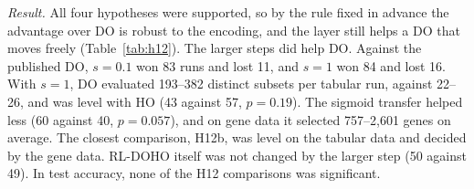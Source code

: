 \documentclass[journal]{IEEEtran}
\begin{document}
\emph{Result.} All four hypotheses were supported, so by the rule fixed in advance the advantage over DO is robust to the encoding, and the layer still helps a DO that moves freely (Table~\ref{tab:h12}). The larger steps did help DO. Against the published DO, $s=0.1$ won 83 runs and lost 11, and $s=1$ won 84 and lost 16. With $s=1$, DO evaluated 193--382 distinct subsets per tabular run, against 22--26, and was level with HO (43 against 57, $p=0.19$). The sigmoid transfer helped less (60 against 40, $p=0.057$), and on gene data it selected 757--2,601 genes on average. The closest comparison, H12b, was level on the tabular data and decided by the gene data. RL-DOHO itself was not changed by the larger step (50 against 49). In test accuracy, none of the H12 comparisons was significant.
\end{document}
